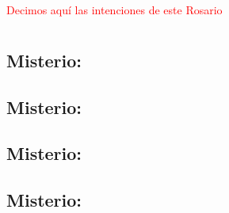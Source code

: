 \documentclass[10pt,oneside]{book}
\newcounter{joyful-counter}
\begin{document}
\vspace{2mm}

\begin{center}
      \textcolor{red}{Decimos aquí las intenciones de este Rosario}
\end{center}

\section*{}
\textcolor{red}{}
\subsection*{ Misterio: }


\begin{center}
      
\end{center}

\subsection*{ Misterio: }


\begin{center}
      
\end{center}

\subsection*{ Misterio: }


\begin{center}
      
\end{center}

\subsection*{ Misterio: }

\end{document}
